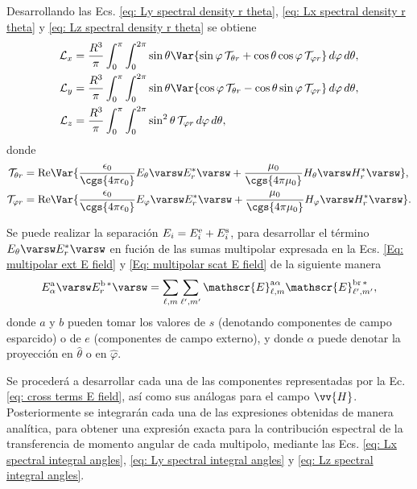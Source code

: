 Desarrollando las Ecs. \eqref{eq: Ly spectral density r theta}, \eqref{eq: Lx spectral density r theta} y \eqref{eq: Lz spectral density r theta} se obtiene
%
\begin{align}
\mathcal{L}_x &= \frac{R^3}{\pi}\int_0^{\pi}\int_0^{2\pi} \sin\theta \Var{\sin\varphi \,\mathcal{T}_{\theta r} + \cos\theta\cos\varphi\,\mathcal{T}_{\varphi r}} \,d\varphi \, d\theta, \label{eq: Lx spectral integral angles}\\
\mathcal{L}_y &= \frac{R^3}{\pi}\int_0^{\pi}\int_0^{2\pi} \sin\theta \Var{\cos\varphi \,\mathcal{T}_{\theta r} - \cos\theta\sin\varphi\,\mathcal{T}_{\varphi r}} \,d\varphi \, d\theta, \label{eq: Ly spectral integral angles}\\
\mathcal{L}_z &= \frac{R^3}{\pi}\int_0^{\pi}\int_0^{2\pi} \sin^{2}\theta \, \mathcal{T}_{\varphi r} \,d\varphi \, d\theta, \label{eq: Lz spectral integral angles}
\end{align}
% 
donde 
\begin{align}
\mathcal{T}_{\theta r} &= {\rm Re}\Var{\frac{\epsilon_0}{\cgs{4\pi\epsilon_0}} E_{\theta}\varsw E_{r}^{*}\varsw + \frac{\mu_0}{\cgs{4\pi\mu_0}} H_{\theta}\varsw H_{r}^{*}\varsw  },\\
\mathcal{T}_{\varphi r} &= {\rm Re}\Var{\frac{\epsilon_0}{\cgs{4\pi\epsilon_0}} E_{\varphi}\varsw E_{r}^{*}\varsw + \frac{\mu_0}{\cgs{4\pi\mu_0}} H_{\varphi}\varsw H_{r}^{*}\varsw  }.
\end{align}

Se puede realizar la separación $E_i=E_i^{\rm e}+E_i^{\rm s}$, para desarrollar el término $E_{\theta}\varsw E_{r}^{*}\varsw$ en fución de las sumas multipolar expresada en la Ecs. \eqref{Eq: multipolar ext E field} y \eqref{Eq: multipolar scat E field} de la siguiente manera
\begin{equation}
E^{\rm a}_{\alpha}\varsw E_{r}^{\rm b \,*}\varsw = \sum_{\ell, m} \sum_{\ell^{\prime}, m^{\prime}} \mathscr{E}_{\ell, m}^{\text{a}\alpha}\mathscr{E}_{\ell^{\prime}, m^{\prime}}^{\text{br}\,*},\label{eq: cross terms E field}
\end{equation}
donde $a$ y $b$ pueden tomar los valores de $s$ (denotando componentes de campo esparcido) o de $e$ (componentes de campo externo), y donde $\alpha$ puede denotar la proyección en $\hat{ \theta}$ o en $\hat{\varphi}$. 

Se procederá a desarrollar cada una de las componentes representadas por la Ec. \eqref{eq: cross terms E field}, así como sus análogas para el campo $\vv{H}$. Posteriormente se integrarán cada una de las expresiones obtenidas de manera analítica, para obtener una expresión exacta para la contribución espectral de la transferencia de momento angular de cada multipolo, mediante las Ecs. \eqref{eq: Lx spectral integral angles}, \eqref{eq: Ly spectral integral angles} y \eqref{eq: Lz spectral integral angles}.

